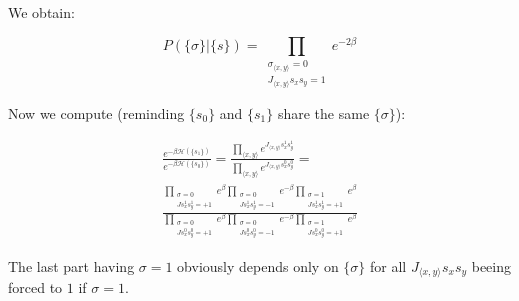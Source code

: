 \documentclass[12pt,handout]{beamer}
\begin{document}
\begin{frame}
\begin{center}

We obtain:

\[
P \left( \lbrace \sigma \rbrace | \lbrace s \rbrace \right) =
\prod_{ \substack{ \sigma_{\langle x, y \rangle} = 0 \\ J_{\langle x, y \rangle} s_x s_y = 1}} e^{-2 \beta}
\]

Now we compute (reminding $\lbrace s_0 \rbrace$ and $\lbrace s_1 \rbrace$ share the same $\lbrace \sigma \rbrace$):

\begin{gather*}
\frac{e^{- \beta \mathcal{H} \left( \lbrace s_1 \rbrace \right)}}{e^{- \beta \mathcal{H} \left( \lbrace s_0 \rbrace \right)}} = \frac{\prod_{\langle x, y \rangle} e^{J_{\langle x, y \rangle} s^1_x s^1_y}}{\prod_{\langle x, y \rangle} e^{J_{\langle x, y \rangle} s^0_x s^0_y}} = \\ \frac{\prod_{\substack{\sigma = 0 \\ J s^1_x s^1_y = +1}} e^{\beta} \prod_{\substack{\sigma = 0 \\ J s^1_x s^1_y = -1}} e^{-\beta} \prod_{\substack{\sigma = 1 \\ J s^1_x s^1_y = +1}} e^{\beta}}{\prod_{\substack{\sigma = 0 \\ J s^0_x s^0_y = +1}} e^{\beta} \prod_{\substack{\sigma = 0 \\ J s^0_x s^0_y = -1}} e^{-\beta} \prod_{\substack{\sigma = 1 \\ J s^0_x s^0_y = +1}} e^{\beta}}
\end{gather*}

The last part having $\sigma = 1$ obviously depends only on $\lbrace \sigma \rbrace$ for all $J_{\langle x, y \rangle} s_x s_y$ beeing forced to $1$ if $\sigma=1$.

\end{center}
\end{frame}
\end{document}
